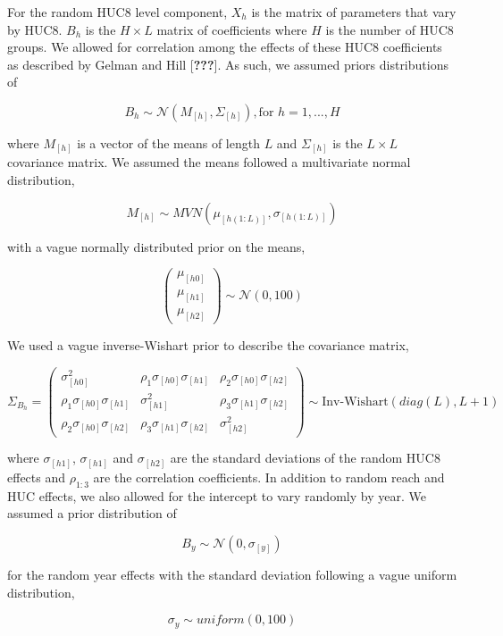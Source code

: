For the random HUC8 level component, \(X_{h}\) is the matrix of
parameters that vary by HUC8. \(B_{h}\) is the \(H \times L\) matrix of
coefficients where \(H\) is the number of HUC8 groups. We allowed for
correlation among the effects of these HUC8 coefficients as described by
Gelman and Hill {[}{\textbf{???}}{]}. As such, we assumed priors
distributions of

\[ B_{h} \sim \mathcal{N}(M_{[h]},\Sigma_{[h]}), \text{for $h = 1,...,H$} \]

where \(M_{[h]}\) is a vector of the means of length \(L\) and
\(\Sigma_{[h]}\) is the \(L \times L\) covariance matrix. We assumed the
means followed a multivariate normal distribution,

\[ M_{[h]} \sim MVN(\mu_{[h(1:L)]}, \sigma_{[h(1:L)]}) \]

with a vague normally distributed prior on the means,

\[ \left( \begin{array}{c} \mu_{[h0]} \\ \mu_{[h1]} \\ \mu_{[h2]} \end{array} \right) \sim \mathcal{N}(0, 100) \]

We used a vague inverse-Wishart prior to describe the covariance matrix,

\[ \Sigma_{B_{h}} = \left( \begin{array}{ccc} \sigma_{[h0]}^2 & \rho_{1}\sigma_{[h0]}\sigma_{[h1]} & \rho_{2}\sigma_{[h0]}\sigma_{[h2]} \\ \rho_{1}\sigma_{[h0]}\sigma_{[h1]} & \sigma_{[h1]}^2 & \rho_{3}\sigma_{[h1]}\sigma_{[h2]} \\ \rho_{2}\sigma_{[h0]}\sigma_{[h2]} & \rho_{3}\sigma_{[h1]}\sigma_{[h2]} & \sigma_{[h2]}^2 \end{array} \right) \sim \text{Inv-Wishart}(diag(L), L+1) \]

where \(\sigma_{[h1]}\), \(\sigma_{[h1]}\) and \(\sigma_{[h2]}\) are the
standard deviations of the random HUC8 effects and \(\rho_{1:3}\) are
the correlation coefficients. In addition to random reach and HUC
effects, we also allowed for the intercept to vary randomly by year. We
assumed a prior distribution of

\[ B_{y} \sim \mathcal{N}(0,\sigma_{[y]}) \]

for the random year effects with the standard deviation following a
vague uniform distribution,

\[ \sigma_{y} \sim uniform(0,100) \]

